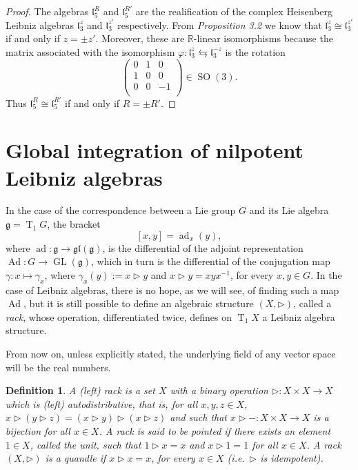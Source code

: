 \documentclass[english,4paper,10pt]{article}
\newcommand{\mg}{\mathfrak{g}}
\newtheorem{definition}[thm]{Definition}
\begin{document}
\begin{proof}
 The algebras $\mathfrak{l}_5^{R}$ and $\mathfrak{l}_5^{R'}$ are the realification of the complex Heisenberg Leibniz algebras $\mathfrak{l}_3^{z}$ and $\mathfrak{l}_3^{z'}$ respectively. From \textit{Proposition 3.2} we know that $\mathfrak{l}_3^{z} \cong \mathfrak{l}_3^{z'}$ if and only if $z = \pm z'$. Moreover, these are $\mathbb{R}$-linear isomorphisms because the matrix associated with the isomorphism $\varphi\colon \mathfrak{l}_3^z \leftrightarrows \mathfrak{l}_3^{-z}$  is the rotation 
 $$
 \begin{pmatrix}
 	0 & 1 & 0 \\
 	1 & 0 & 0 \\
 	0 & 0 & -1 \\
 \end{pmatrix} \in \operatorname{SO}(3).
 $$
  Thus $\mathfrak{l}_5^{R} \cong \mathfrak{l}_5^{R'}$ if and only if $R = \pm R'$.
\end{proof}

\section{Global integration of nilpotent Leibniz algebras}

In the case of the correspondence between a Lie group $G$ and its Lie algebra $\mg=\operatorname{T}_1G$, the bracket 
$$
[x,y]=\operatorname{ad}_x(y),
$$ where
$\operatorname{ad}\colon\mg\rightarrow\mathfrak{gl}(\mg)$, is the differential of the adjoint representation $\operatorname{Ad}\colon G\rightarrow \operatorname{GL}(\mg)$, which in turn is the differential of the conjugation map $\gamma: x \mapsto \gamma_x$, where $\gamma_x(y):=x \rhd y$ and $x \rhd y = xyx^{-1}$, for every $x,y \in G$. In the case of Leibniz algebras, there is no hope, as we will see, of finding such a map $\operatorname{Ad}$, but it is still possible to define an algebraic structure $(X,\rhd)$, called a \emph{rack}, whose operation, differentiated twice, defines on $\operatorname{T}_1X$ a Leibniz algebra structure.

From now on, unless explicitly stated, the underlying field of any vector space will be the real numbers.

\begin{definition}
	A (left) rack is a set $X$ with a binary operation $\rhd: X\times X\rightarrow X$ which is (left) autodistributive, that is, for all $x,y,z\in X$, $x\rhd\left(y\rhd z\right)=\left(x\rhd y\right)\rhd\left(x\rhd z\right)$ and such that $x\rhd -:X\times X\rightarrow X$ is a bijection for all $x\in X$. A rack is said to be pointed if there exists an element $1\in X$, called the unit, such that $1\rhd x=x$ and $x\rhd 1=1$ for all $x\in X$. 	A rack $(X,\rhd)$ is a quandle if $x\rhd x=x$, for every $x\in X$ (i.e.\ $\rhd$ is idempotent).
\end{definition}
\end{document}
